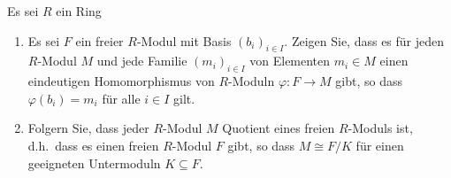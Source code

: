 \begin{question}[subtitle = Jeder Modul ist Quotient eines freien Moduls]
  \label{question: interaction of free modues with other modules}
  Es sei $R$ ein Ring
  \begin{enumerate}
    \item
      Es sei $F$ ein freier $R$-Modul mit Basis $(b_i)_{i \in I}$.
      Zeigen Sie, dass es für jeden $R$-Modul $M$ und jede Familie $(m_i)_{i \in I}$ von Elementen $m_i \in M$ einen eindeutigen Homomorphismus von $R$-Moduln $\varphi \colon F \to M$ gibt, so dass $\varphi(b_i) = m_i$ für alle $i \in I$ gilt.
    \item
      Folgern Sie, dass jeder $R$-Modul $M$ Quotient eines freien $R$-Moduls ist, d.h.\ dass es einen freien $R$-Modul $F$ gibt, so dass $M \cong F/K$ für einen geeigneten Untermoduln $K \subseteq F$.
  \end{enumerate}
\end{question}


